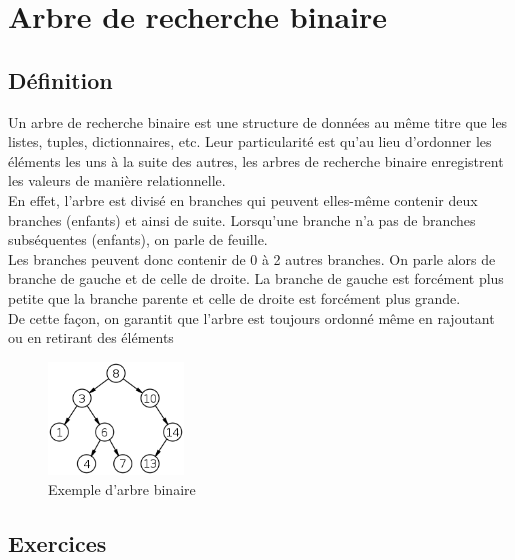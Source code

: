 \section{Arbre de recherche binaire}
\subsection{Définition}

Un arbre de recherche binaire est une structure de données au même titre que les listes, tuples, dictionnaires, etc. Leur particularité est qu'au lieu d'ordonner les éléments les uns à la suite des autres, les arbres de recherche binaire enregistrent les valeurs de manière relationnelle.\\

En effet, l'arbre est divisé en branches qui peuvent elles-même contenir deux branches (enfants) et ainsi de suite. Lorsqu'une branche n'a pas de branches subséquentes (enfants), on parle de feuille.\\

Les branches peuvent donc contenir de 0 à 2 autres branches. On parle alors de branche de gauche et de celle de droite. La branche de gauche est forcément plus petite que la branche parente et celle de droite est forcément plus grande.\\

De cette façon, on garantit que l'arbre est toujours ordonné même en rajoutant ou en retirant des éléments\\

\begin{figure}[h]
    \centering
    \includegraphics[width=0.32\textwidth]{img/binary-search-tree.png}
    \caption{Exemple d'arbre binaire}
\end{figure}

\subsection{Exercices}

